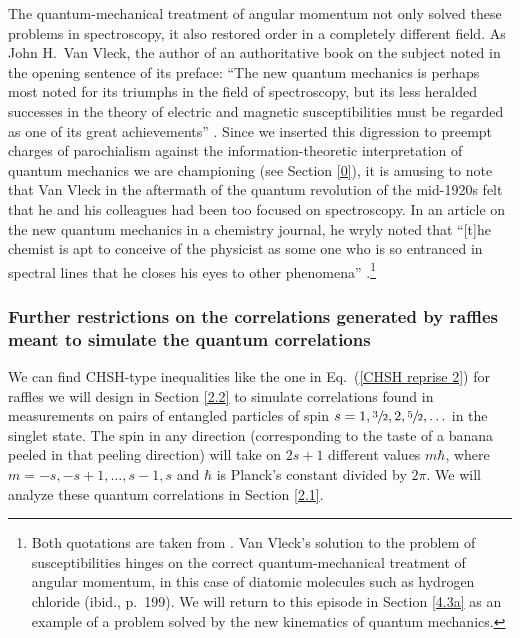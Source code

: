 The quantum-mechanical treatment of angular momentum not only solved these problems in spectroscopy, it also restored order in a completely different field. As John H.\ Van Vleck, the author of an authoritative book on the subject noted in the opening sentence of its preface: ``The new quantum mechanics  is perhaps most noted for its triumphs in the field of spectroscopy, but its less heralded successes in the theory of electric and magnetic susceptibilities must be regarded as one of its great achievements'' \citep[p.\ vii]{Van Vleck 1932}. Since we inserted this digression to preempt charges of parochialism against the information-theoretic interpretation of quantum mechanics we are championing (see Section \ref{0}), it is amusing to note that Van Vleck in the aftermath of the quantum revolution of the mid-1920s felt that he and his colleagues had been too focused on spectroscopy. In an article on the new quantum mechanics in a chemistry journal, he wryly noted that ``[t]he chemist is apt to conceive of the physicist as some one who is so entranced in spectral lines that he closes his eyes to other phenomena'' \citep[p.\ 493]{Van Vleck 1928}.\footnote{Both quotations are taken from \citet[p.\ 137]{Midwinter and Janssen 2013}. Van Vleck's solution to the problem of susceptibilities hinges on the correct quantum-mechanical treatment of angular momentum, in this case of diatomic molecules such as hydrogen chloride (ibid., p.\ 199). We will return to this episode in Section \ref{4.3a} as an example of a problem solved by the new kinematics of quantum mechanics.\label{Van Vleck}}

\subsubsection{Further restrictions on the correlations generated by raffles meant to simulate the quantum correlations} \label{1.6.3}

We can find CHSH-type inequalities like the one in Eq.\ (\ref{CHSH reprise 2}) for raffles we will design in Section \ref{2.2} to simulate correlations found in measurements on pairs of entangled particles of spin $s  = 1, \sfrac32, 2, \sfrac52, \ldots$ in the singlet state. The spin in any direction (corresponding to the taste of a banana peeled in that peeling direction) will take on $2s \! + \! 1$ different values $m \hbar$, where $m = -s, -s+1, \ldots, s-1, s$ and $\hbar$ is Planck's constant divided by $2\pi$. We will analyze these quantum correlations in Section \ref{2.1}. 

